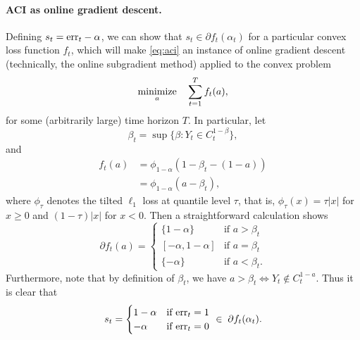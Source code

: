 \documentclass{article}
\begin{document}
\paragraph{ACI as online gradient descent.}

Defining $s_t = \mathrm{err}_t - \alpha$, we can show that $s_t \in \partial
f_t(\alpha_t)$ for a particular convex loss function $f_t$, which will make 
\eqref{eq:aci} an instance of online gradient descent (technically, the online
subgradient method) applied to the convex problem
\[
\operatorname*{minimize}_a \quad \sum_{t=1}^T f_t(a),
\]
for some (arbitrarily large) time horizon $T$. In particular, let
\[
\beta_t = \sup \{ \beta : Y_t \in C_t^{1-\beta} \}, 
\]
and 
\begin{align*}
\nonumber
f_t(a) &= \phi_{1-\alpha}(1-\beta_t - (1-a)) \\
&= \phi_{1-\alpha}(a - \beta_t),
\end{align*}
where $\phi_\tau$ denotes the tilted $\ell_1$ loss at quantile level $\tau$,
that is, $\phi_\tau(x) = \tau |x|$ for $x \geq 0$ and $(1-\tau) |x|$ for $x <
0$. Then a straightforward calculation shows
\[
\partial f_t(a) = 
\begin{cases}
\{1-\alpha\} & \text{if $a > \beta_t$} \\
[-\alpha, 1-\alpha] & \text{if $a = \beta_t$} \\
\{-\alpha\} & \text{if $a < \beta_t$}.
\end{cases}
\]
Furthermore, note that by definition of $\beta_t$, we have $a > \beta_t \iff Y_t
\notin C_t^{1-a}$. Thus it is clear that
\[
s_t = 
\begin{cases}
1-\alpha & \text{if $\mathrm{err}_t = 1$} \\
-\alpha & \text{if $\mathrm{err}_t = 0$}
\end{cases}
\; \in \; \partial f_t(\alpha_t).
\]



\end{document}

